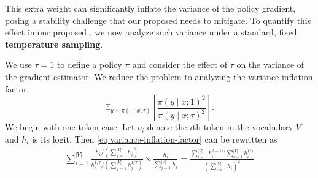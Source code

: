 This extra weight can significantly inflate the variance of the policy gradient, posing a stability challenge that our proposed \alg needs to mitigate.
To quantify this effect in our proposed \alg, we now analyze such variance under a standard, fixed \textbf{temperature sampling}.


We use $\tau=1$ to define a policy $\pi$ and consider the effect of $\tau$ on the variance of the gradient estimator. We reduce the problem to analyzing the variance inflation factor
\begin{equation}
\label{eq:variance-inflation-factor}
\mathbb{E}_{y\sim\pi(\cdot\mid x;\tau)}\left[\frac{\pi(y\mid x;1)^2}{\pi(y\mid x;\tau)^2}\right].
\end{equation}
We begin with one-token case. Let $o_i$ denote the $i$th token in the vocabulary $V$ and $h_i$ is its logit. Then \eqref{eq:variance-inflation-factor} can be rewritten as
\begin{align*}
    \sum_{i=1}^{|V|}\frac{h_i/(\sum_{j=1}^{|V|} h_j)}{h^{1/\tau}_i/(\sum_{j=1}^{|V|} h^{1/\tau}_j)}\times\frac{h_i}{\sum_{j=1}^{|V|} h_j}
    = \frac{\sum_{i=1}^{|V|} h_i^{2-1/\tau}\sum_{i=1}^{|V|} h^{1/\tau}_i}{\left(\sum_{i=1}^{|V|} h_i\right)^2}
\end{align*}

